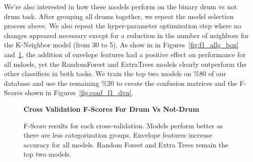 \documentclass[runningheads,a4paper]{llncs}
\begin{document}
\begin{appendices}
We're also interested in how these models perform on the binary drum vs not drum task.
After grouping all drums together, we repeat the model selection process above. We also repeat the hyper-parameter optimization step where no changes appeared necessary except for a reduction in the number of neighbors for the K-Neighbor model (from 30 to 5). As show in in Figures~\ref{fig:f1_allg_box} and~\ref{fig:f1_dvn_box}, the addition of envelope features had a positive effect on performance for all mdoels, yet the RandomForest and ExtraTrees models clearly outperform the other classifiers in both tasks. We train the top two models on \%80 of our database and use the remaining \%20 to create the confusion matrices and the F-Scores shown in Figures~\ref{fig:conf_f1_dvn}.
\begin{figure}[h!]   
    \begin{center}
        \textbf{Cross Validation F-Scores For Drum Vs Not-Drum}
    \caption{F-Score results for each cross-validation. Models perform better as there are less categorization groups. Envelope features increase accuracy for all models. Random Forest and Extra Trees remain the top two models. }
    \label{fig:f1_dvn_box}
    \end{center}
\end{figure}



\end{appendices}
\end{document}
